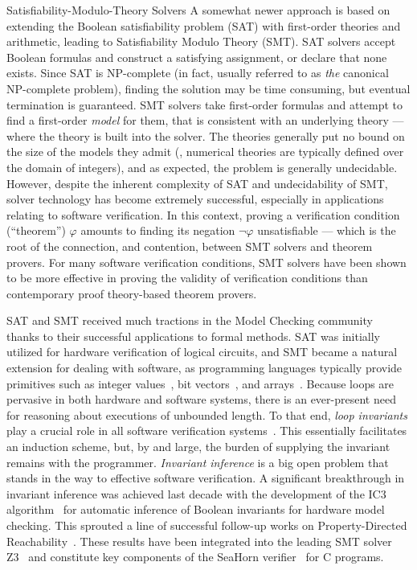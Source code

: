 \begin{paragraph}{Satisfiability-Modulo-Theory Solvers}
A somewhat newer approach is based on extending the
Boolean satisfiability problem (SAT) with first-order theories and arithmetic, leading to
Satisfiability Modulo Theory (SMT).
SAT solvers accept Boolean formulas and construct a satisfying assignment, or
declare that none exists.
Since SAT is NP-complete (in fact, usually referred to as \emph{the} canonical
NP-complete problem), finding the solution may be time consuming, but eventual
termination is guaranteed.
SMT solvers take first-order formulas and attempt to find a first-order
\emph{model} for them, that is consistent with an underlying theory --- where the
theory is built into the solver.
The theories generally put no bound on the size of the models they admit
(\eg, numerical theories are typically defined over the domain of integers),
and as expected, the problem is generally undecidable.
However, despite the inherent complexity of SAT and undecidability of SMT,
solver technology has become extremely successful, especially in applications
relating to software verification.
In this context, proving a verification condition (``theorem'') $\varphi$
amounts to finding its negation $\lnot\varphi$ unsatisfiable --- which is the root
of the connection, and contention, between SMT solvers and theorem provers.
For many software verification conditions, SMT solvers have been shown to be
more effective in proving the validity of verification conditions than
contemporary proof theory-based theorem provers.

SAT and SMT received much tractions in the Model Checking community~\cite{Book2001:Clarke,SSS2014:Grumberg} thanks to their successful applications to formal methods.
SAT was initially utilized for hardware verification of logical circuits, and SMT became a natural extension for dealing with software, as programming languages typically provide primitives such as integer values~\cite{CAV2006:Dutertre}, bit vectors~\cite{TACAS2007:Bryant}, and arrays~\cite{CAV2007:Ganesh}.
Because loops are pervasive in both hardware and software systems, there is an ever-present need for reasoning about executions of unbounded length.
To that end, \emph{loop invariants} play a crucial role in all software verification systems~\cite{LPAR2010:Leino,PLDI2016:Padon,ECOOP2013:Regis}.
This essentially facilitates an induction scheme, but, by and large, the burden of supplying the invariant remains with the programmer.
\emph{Invariant inference} is a big open problem that stands in the way to effective software verification.
A significant breakthrough in invariant inference was achieved last decade with the development of the IC3 algorithm~\cite{VMCAI2011:Bradley} for automatic inference of Boolean invariants for hardware model checking.
This sprouted a line of successful follow-up works on Property-Directed Reachability~\cite{VMCAI2015:Bjorner,CAV2016:Fedyukovich,CAV2014:Vizel,VMCAI2017:Vizel,CAV2019:Shemer}.
These results have been integrated into the leading SMT solver Z3~\cite{Z3SMT,CAV2013:Komuravelli,CAV2014:Komuravelli} and constitute key components of the SeaHorn verifier~\cite{TACAS2015:Gurfinkel} for C programs.
\end{paragraph}


